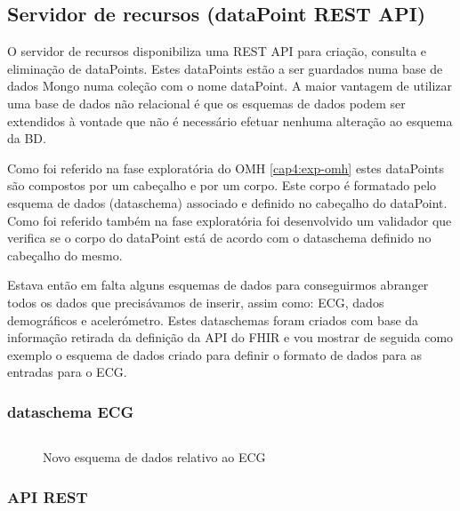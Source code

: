\subsection{Servidor de recursos (dataPoint REST API) }
O servidor de recursos disponibiliza uma \gls{REST} \gls{API} para criação, consulta e eliminação de dataPoints. Estes dataPoints estão a ser guardados numa base de dados Mongo numa coleção com o nome dataPoint. A maior vantagem de utilizar uma base de dados não relacional é que os esquemas de dados podem ser extendidos à vontade que não é necessário efetuar nenhuma alteração ao esquema da BD. \par 
Como foi referido na fase exploratória do \gls{OMH} \ref{cap4:exp-omh} estes dataPoints são compostos por um cabeçalho e por um corpo. Este corpo é formatado pelo esquema de dados (dataschema) associado e definido no cabeçalho do dataPoint. Como foi referido também na fase exploratória foi desenvolvido um validador que verifica se o corpo do dataPoint está de acordo com o dataschema definido no cabeçalho do mesmo. \par
Estava então em falta alguns esquemas de dados para conseguirmos abranger todos os dados que precisávamos de inserir, assim como: \gls{ECG}, dados demográficos e acelerómetro. Estes dataschemas foram criados com base da informação retirada da definição da \gls{API} do \gls{FHIR} e vou mostrar de seguida como exemplo o esquema de dados criado para definir o formato de dados para as entradas para o \gls{ECG}. \newpage
\subsubsection{dataschema ECG}
\begin{figure}[H]
\inputminted[fontsize=\scriptsize]{json}{code/ecg.json}
\caption[Novo esquema de dados relativo ao ECG]{Novo esquema de dados relativo ao ECG}
\label{f:ecgjsonschema}
\end{figure}

\subsubsection{API REST}

